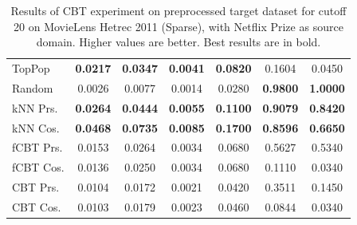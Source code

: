 \begin{table}[hbt]
\begin{tabulary}{\textwidth}{|L|CCCCCC|}
\hline
TopPop & \textbf{0.0217} & \textbf{0.0347} & \textbf{0.0041} & \textbf{0.0820} & 0.1604 & 0.0450 \\
Random & 0.0026 & 0.0077 & 0.0014 & 0.0280 & \textbf{0.9800} & \textbf{1.0000} \\
kNN Prs. & \textbf{0.0264} & \textbf{0.0444} & \textbf{0.0055} & \textbf{0.1100} & \textbf{0.9079} & \textbf{0.8420} \\
kNN Cos. & \textbf{0.0468} & \textbf{0.0735} & \textbf{0.0085} & \textbf{0.1700} & \textbf{0.8596} & \textbf{0.6650} \\
fCBT Prs. & 0.0153 & 0.0264 & 0.0034 & 0.0680 & 0.5627 & 0.5340 \\
fCBT Cos. & 0.0136 & 0.0250 & 0.0034 & 0.0680 & 0.1110 & 0.0340 \\
CBT Prs. & 0.0104 & 0.0172 & 0.0021 & 0.0420 & 0.3511 & 0.1450 \\
CBT Cos. & 0.0103 & 0.0179 & 0.0023 & 0.0460 & 0.0844 & 0.0340 \\
\hline
\end{tabulary}
\caption{Results of CBT experiment on preprocessed target dataset for cutoff 20 on MovieLens Hetrec 2011 (Sparse), with Netflix Prize as source domain. Higher values are better. Best results are in bold.}
\end{table}

